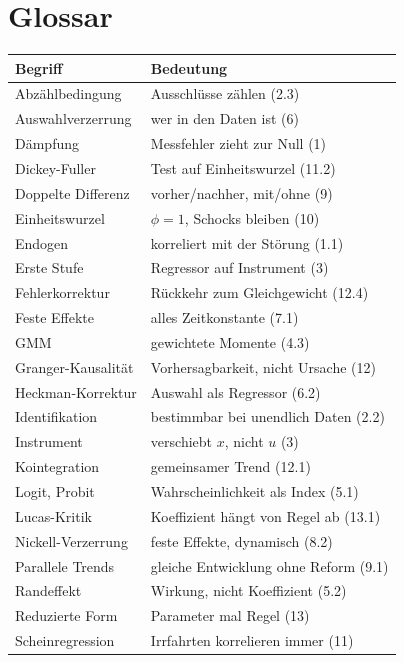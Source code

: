 \section{Glossar}

\begin{merksatz}
\begin{center}
{\small
\renewcommand{\arraystretch}{1.3}
\begin{longtable}{@{}P{3.6cm}P{5.0cm}@{}}
\toprule
\textbf{Begriff} & \textbf{Bedeutung}\\
\midrule
\endhead
Abzählbedingung & Ausschlüsse zählen (2.3)\\
Auswahlverzerrung & wer in den Daten ist (6)\\
Dämpfung & Messfehler zieht zur Null (1)\\
Dickey-Fuller & Test auf Einheitswurzel (11.2)\\
Doppelte Differenz & vorher/nachher, mit/ohne (9)\\
Einheitswurzel & $\phi = 1$, Schocks bleiben (10)\\
Endogen & korreliert mit der Störung (1.1)\\
Erste Stufe & Regressor auf Instrument (3)\\
Fehlerkorrektur & Rückkehr zum Gleichgewicht (12.4)\\
Feste Effekte & alles Zeitkonstante (7.1)\\
GMM & gewichtete Momente (4.3)\\
Granger-Kausalität & Vorhersagbarkeit, nicht Ursache (12)\\
Heckman-Korrektur & Auswahl als Regressor (6.2)\\
Identifikation & bestimmbar bei unendlich Daten (2.2)\\
Instrument & verschiebt $x$, nicht $u$ (3)\\
Kointegration & gemeinsamer Trend (12.1)\\
Logit, Probit & Wahrscheinlichkeit als Index (5.1)\\
Lucas-Kritik & Koeffizient hängt von Regel ab (13.1)\\
Nickell-Verzerrung & feste Effekte, dynamisch (8.2)\\
Parallele Trends & gleiche Entwicklung ohne Reform (9.1)\\
Randeffekt & Wirkung, nicht Koeffizient (5.2)\\
Reduzierte Form & Parameter mal Regel (13)\\
Scheinregression & Irrfahrten korrelieren immer (11)\\

\end{longtable}}
\end{center}
\end{merksatz}
